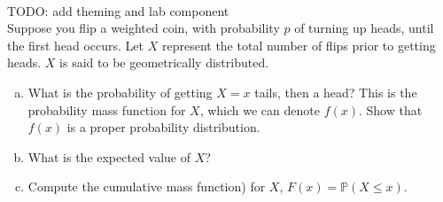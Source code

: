 \documentclass[]{article}
\newif\ifsolutions
\renewcommand{\answer}[1]{{\color{mydarkblue}\textbf{Solution:}#1}}
\begin{document}
\begin{qunlist}

 \\ TODO: add theming and lab component \\ Suppose you flip a weighted coin, with probability $p$ of turning up heads, until the first head occurs. Let $X$ represent the total number of flips prior to getting heads. $X$ is said to be geometrically distributed.

\begin{enumerate}[a)]

\qpart
\item What is the probability of getting $X=x$ tails, then a head?  This is the probability mass function for $X$, which we can denote $f(x)$.  Show that $f(x)$ is a proper probability distribution.

\ifsolutions{ \answer{ The probability of getting $x$ tails is $(1-p)^x$. Therefore the probability of getting $x$ tails, then getting a head is
	\[ f(x) = (1-p)^x p. \]
	To show this is a valid probability distribution, we need to make sure the sum of $f(x)$ over all possible $x$ is 1. Using the formula for an infinite geometric series,
	\[ \sum_{x=0}^{\infty} f(x) = p \sum_{x=0}^{\infty} (1-p)^x = p \cdot \frac{1}{1-(1-p)} = 1. \]
}}\fi

\qpart
\item What is the expected value of $X$?


\qpart
\item Compute the cumulative mass function) for $X$, $F(x) = \mathbb{P}(X \leq x)$.

\ifsolutions{ \answer{ 
	We can use the formula for a finite geometric series to find $F(x)$,
	\[ F(x) = p \sum_{y=0}^x (1-p)^y = p \cdot \frac{1 - (1-p)^x}{1 - (1-p)} = 1 - (1-p)^x. \]
}}\fi

\end{enumerate}



\end{qunlist}
\end{document}
